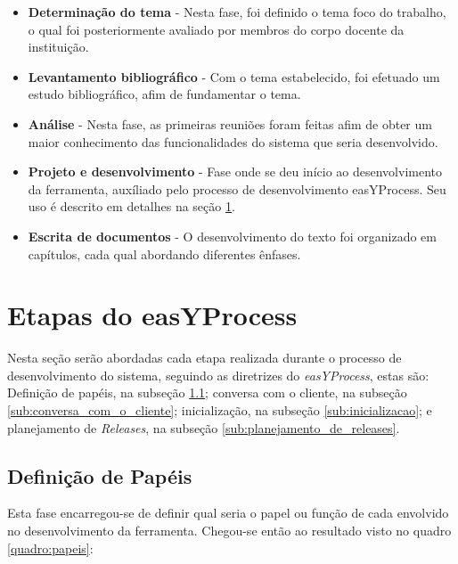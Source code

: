 \documentclass[a4paper,12pt]{monografia}
\begin{document}
\begin{itemize}
\item \textbf{Determinação do tema} - Nesta fase, foi definido o tema foco do trabalho, o qual foi posteriormente avaliado por membros do corpo docente da instituição.

\item \textbf{Levantamento bibliográfico} - Com o tema estabelecido, foi efetuado um estudo bibliográfico, afim de fundamentar o tema.

\item \textbf{Análise} - Nesta fase, as primeiras reuniões foram feitas afim de obter um maior conhecimento das funcionalidades do sistema que seria desenvolvido.

\item \textbf{Projeto e desenvolvimento} - Fase onde se deu início ao desenvolvimento da ferramenta, auxíliado pelo processo de desenvolvimento easYProcess. Seu uso é descrito em detalhes na seção \ref{sec:processo_de_desenvolvimento}.

\item \textbf{Escrita de documentos} - O desenvolvimento do texto foi organizado em capítulos, cada qual abordando diferentes ênfases.

\end{itemize}

\section{Etapas do easYProcess} %
\label{sec:processo_de_desenvolvimento}

Nesta seção serão abordadas cada etapa realizada durante o processo de desenvolvimento do sistema, seguindo as diretrizes do \textit{easYProcess}, estas são: Definição de papéis, na subseção \ref{sub:definicao_de_papeis}; conversa com o cliente, na subseção \ref{sub:conversa_com_o_cliente}; inicialização, na subseção \ref{sub:inicializacao}; e planejamento de \textit{Releases}, na subseção \ref{sub:planejamento_de_releases}.

\subsection{Definição de Papéis} %
\label{sub:definicao_de_papeis}

Esta fase encarregou-se de definir qual seria o papel ou função de cada envolvido no desenvolvimento da ferramenta. Chegou-se então ao resultado visto no quadro \ref{quadro:papeis}:
\end{document}
